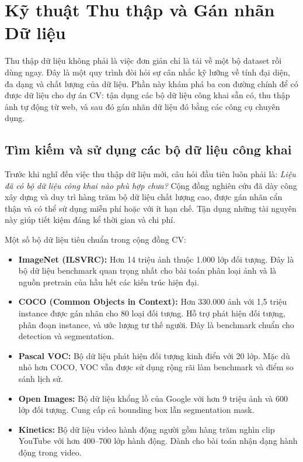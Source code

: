 \section{Kỹ thuật Thu thập và Gán nhãn Dữ liệu}
\label{sec:data_collection_labeling}

Thu thập dữ liệu không phải là việc đơn giản chỉ là tải về một bộ dataset rồi dùng ngay. Đây là một quy trình đòi hỏi sự cân nhắc kỹ lưỡng về tính đại diện, đa dạng và chất lượng của dữ liệu. Phần này khám phá ba con đường chính để có được dữ liệu cho dự án CV: tận dụng các bộ dữ liệu công khai sẵn có, thu thập ảnh tự động từ web, và sau đó gán nhãn dữ liệu đó bằng các công cụ chuyên dụng.

\subsection{Tìm kiếm và sử dụng các bộ dữ liệu công khai}
\label{subsec:public_datasets}

Trước khi nghĩ đến việc thu thập dữ liệu mới, câu hỏi đầu tiên luôn phải là: \textit{Liệu đã có bộ dữ liệu công khai nào phù hợp chưa?} Cộng đồng nghiên cứu đã dày công xây dựng và duy trì hàng trăm bộ dữ liệu chất lượng cao, được gán nhãn cẩn thận và có thể sử dụng miễn phí hoặc với ít hạn chế. Tận dụng những tài nguyên này giúp tiết kiệm đáng kể thời gian và chi phí.

Một số bộ dữ liệu tiêu chuẩn trong cộng đồng CV:

\begin{itemize}
    \item \textbf{ImageNet (ILSVRC):} Hơn 14 triệu ảnh thuộc 1.000 lớp đối tượng. Đây là bộ dữ liệu benchmark quan trọng nhất cho bài toán phân loại ảnh và là nguồn pretrain của hầu hết các kiến trúc hiện đại.

    \item \textbf{COCO (Common Objects in Context):} Hơn 330.000 ảnh với 1,5 triệu instance được gán nhãn cho 80 loại đối tượng. Hỗ trợ phát hiện đối tượng, phân đoạn instance, và ước lượng tư thế người. Đây là benchmark chuẩn cho detection và segmentation.

    \item \textbf{Pascal VOC:} Bộ dữ liệu phát hiện đối tượng kinh điển với 20 lớp. Mặc dù nhỏ hơn COCO, VOC vẫn được sử dụng rộng rãi làm benchmark và điểm so sánh lịch sử.

    \item \textbf{Open Images:} Bộ dữ liệu khổng lồ của Google với hơn 9 triệu ảnh và 600 lớp đối tượng. Cung cấp cả bounding box lẫn segmentation mask.

    \item \textbf{Kinetics:} Bộ dữ liệu video hành động người gồm hàng trăm nghìn clip YouTube với hơn 400--700 lớp hành động. Dành cho bài toán nhận dạng hành động trong video.
\end{itemize}

